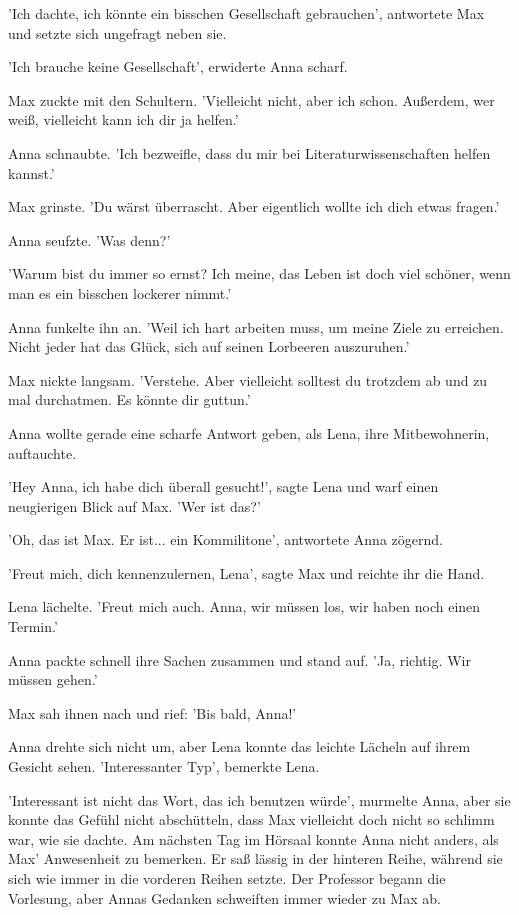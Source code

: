 \documentclass[12pt]{article}
\begin{document}
'Ich dachte, ich könnte ein bisschen Gesellschaft gebrauchen', antwortete Max und setzte sich ungefragt neben sie. 

'Ich brauche keine Gesellschaft', erwiderte Anna scharf. 

Max zuckte mit den Schultern. 'Vielleicht nicht, aber ich schon. Außerdem, wer weiß, vielleicht kann ich dir ja helfen.' 

Anna schnaubte. 'Ich bezweifle, dass du mir bei Literaturwissenschaften helfen kannst.' 

Max grinste. 'Du wärst überrascht. Aber eigentlich wollte ich dich etwas fragen.' 

Anna seufzte. 'Was denn?' 

'Warum bist du immer so ernst? Ich meine, das Leben ist doch viel schöner, wenn man es ein bisschen lockerer nimmt.' 

Anna funkelte ihn an. 'Weil ich hart arbeiten muss, um meine Ziele zu erreichen. Nicht jeder hat das Glück, sich auf seinen Lorbeeren auszuruhen.' 

Max nickte langsam. 'Verstehe. Aber vielleicht solltest du trotzdem ab und zu mal durchatmen. Es könnte dir guttun.' 

Anna wollte gerade eine scharfe Antwort geben, als Lena, ihre Mitbewohnerin, auftauchte. 

'Hey Anna, ich habe dich überall gesucht!', sagte Lena und warf einen neugierigen Blick auf Max. 'Wer ist das?' 

'Oh, das ist Max. Er ist... ein Kommilitone', antwortete Anna zögernd. 

'Freut mich, dich kennenzulernen, Lena', sagte Max und reichte ihr die Hand. 

Lena lächelte. 'Freut mich auch. Anna, wir müssen los, wir haben noch einen Termin.' 

Anna packte schnell ihre Sachen zusammen und stand auf. 'Ja, richtig. Wir müssen gehen.' 

Max sah ihnen nach und rief: 'Bis bald, Anna!' 

Anna drehte sich nicht um, aber Lena konnte das leichte Lächeln auf ihrem Gesicht sehen. 'Interessanter Typ', bemerkte Lena. 

'Interessant ist nicht das Wort, das ich benutzen würde', murmelte Anna, aber sie konnte das Gefühl nicht abschütteln, dass Max vielleicht doch nicht so schlimm war, wie sie dachte. Am nächsten Tag im Hörsaal konnte Anna nicht anders, als Max' Anwesenheit zu bemerken. Er saß lässig in der hinteren Reihe, während sie sich wie immer in die vorderen Reihen setzte. Der Professor begann die Vorlesung, aber Annas Gedanken schweiften immer wieder zu Max ab. 
\end{document}

